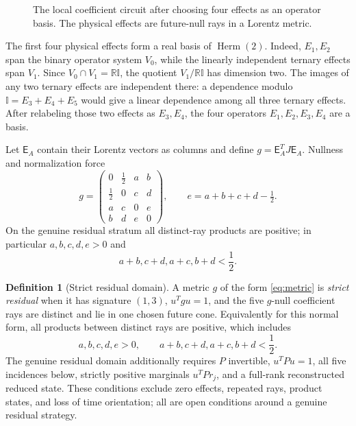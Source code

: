 \documentclass[11pt]{article}
\theoremstyle{definition}
\newtheorem{definition}[theorem]{Definition}
\newcommand{\Herm}{\operatorname{Herm}}
\newcommand{\id}{\mathbb I}
\newcommand{\R}{\mathbb R}
\begin{document}
\begin{figure}[t]
\centering

\caption{The local coefficient circuit after choosing four effects as an
operator basis. The physical effects are future-null rays in a Lorentz
metric.}
\label{fig:circuit}
\end{figure}

The first four physical effects form a real basis of \(\Herm(2)\). Indeed,
\(E_1,E_2\) span the binary operator system \(V_0\), while the linearly
independent ternary effects span \(V_1\). Since
\(V_0\cap V_1=\R\id\), the quotient \(V_1/\R\id\) has dimension two.
The images of any two ternary effects are independent there: a dependence
modulo \(\id=E_3+E_4+E_5\) would give a linear dependence among all three
ternary effects. After relabeling those two effects as \(E_3,E_4\), the four
operators \(E_1,E_2,E_3,E_4\) are a basis.

Let \(\mathsf E_A\) contain their Lorentz vectors as columns and define
\(g=\mathsf E_A^TJ\mathsf E_A\). Nullness and normalization force
\begin{equation}
\label{eq:metric}
g=
\begin{pmatrix}
0&\tfrac12&a&b\\
\tfrac12&0&c&d\\
a&c&0&e\\
b&d&e&0
\end{pmatrix},
\qquad e=a+b+c+d-\tfrac12.
\end{equation}
On the genuine residual stratum all distinct-ray products are positive; in
particular \(a,b,c,d,e>0\) and
\[
a+b,c+d,a+c,b+d<\frac12.
\]

\begin{definition}[Strict residual domain]
\label{def:strict-residual}
A metric \(g\) of the form \eqref{eq:metric} is \emph{strict residual} when
it has signature \((1,3)\), \(u^Tgu=1\), and the five \(g\)-null coefficient
rays are distinct and lie in one chosen future cone. Equivalently for this
normal form, all products between distinct rays are positive, which includes
\[
a,b,c,d,e>0,\qquad
a+b,c+d,a+c,b+d<\frac12.
\]
The genuine residual domain additionally requires \(P\) invertible,
\(u^TPu=1\), all five incidences below, strictly positive marginals
\(u^TPr_j\), and a full-rank reconstructed reduced state. These conditions
exclude zero effects, repeated rays, product states, and loss of time
orientation; all are open conditions around a genuine residual strategy.
\end{definition}
\end{document}
